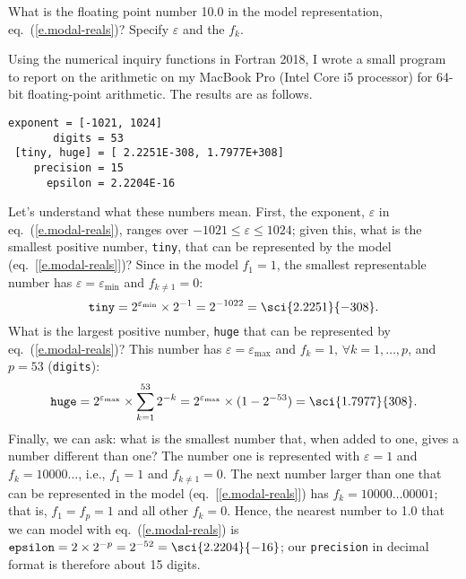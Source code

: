 \begin{exercisebox}
What is the floating point number 10.0 in the model representation, eq.~(\ref{e.modal-reals})? Specify $\varepsilon$ and the $f_{k}$.
\label{ex.binary-representation}
\end{exercisebox}

Using the numerical inquiry functions in Fortran 2018, I wrote a small program to report on the arithmetic on my MacBook Pro (Intel Core i5 processor) for 64-bit floating-point arithmetic. The results are as follows.
\begin{Verbatim}[numbers=none]
     exponent = [-1021, 1024]
       digits = 53
 [tiny, huge] = [ 2.2251E-308, 1.7977E+308]
    precision = 15
      epsilon = 2.2204E-16
\end{Verbatim}
Let's understand what these numbers mean.
First, the exponent, $\varepsilon$ in eq.~(\ref{e.modal-reals}), ranges over $-1021\le\varepsilon\le1024$;%
given this, what is the smallest positive number, \texttt{tiny}, that can be represented by the model (eq.~[\ref{e.modal-reals}])? Since in the model $f_{1}=1$, the smallest representable number has $\varepsilon = \varepsilon_{\min}$ and $f_{k\neq 1} = 0$:
\[\mathtt{tiny} = 2^{\varepsilon_{\min}}\times 2^{-1} = 2^{-1022} = \sci{2.2251}{-308}.\]
What is the largest positive number, \texttt{huge} that can be represented by eq.~(\ref{e.modal-reals})? This number has $\varepsilon=\varepsilon_{\max}$ and $f_{k}=1,\,\forall k=1,\ldots,p$, and $p = 53$ (\texttt{digits}):
\[
\mathtt{huge} = 2^{\varepsilon_{\max}}\times \sum_{k=1}^{53} 2^{-k} = 2^{\varepsilon_{\max}}\times(1-2^{-53}) = \sci{1.7977}{308}.
\]
Finally, we can ask: what is the smallest number that, when added to one, gives a number different than one? The number one is represented with $\varepsilon = 1$ and $f_{k} = 10000\ldots$, i.e., $f_{1}=1$ and $f_{k\neq1}=0$. The next number larger than one that can be represented in the model (eq.~[\ref{e.modal-reals}]) has $f_{k} = 10000\ldots00001$; that is, $f_{1}=f_{p}=1$ and all other $f_{k}=0$. Hence, the nearest number to 1.0 that we can model with eq.~(\ref{e.modal-reals}) is $\mathtt{epsilon} = 2\times2^{-p} = 2^{-52} = \sci{2.2204}{-16}$; our \verb+precision+ in decimal format is therefore about 15 digits.

